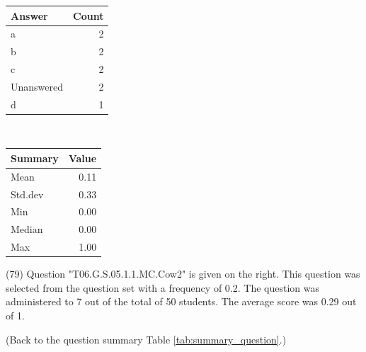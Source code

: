 \documentclass[12pt,english,nohyper]{tufte-handout}\usepackage[]{graphicx}\usepackage[]{color}
\begin{document}
\begin{center}%
\begin{tabular}{lr}
  \hline
Answer & Count \\ 
  \hline
a &   2 \\ 
  b &   2 \\ 
  c &   2 \\ 
  Unanswered &   2 \\ 
  d &   1 \\ 
   \hline
\end{tabular}
~~~~~~~~%
\begin{tabular}{lr}
  \hline
Summary & Value \\ 
  \hline
Mean & 0.11 \\ 
  Std.dev & 0.33 \\ 
  Min & 0.00 \\ 
  Median & 0.00 \\ 
  Max & 1.00 \\ 
   \hline
\end{tabular}
\end{center}\newpage{} (79) Question "T06.G.S.05.1.1.MC.Cow2" is given on the right. This question was selected from the question set with a frequency of 0.2. The question was administered to 7 out of the total of 50 students. The average score was 0.29 out of 1.

 (Back to the question summary Table \ref{tab:summary_question}.)
\end{document}
